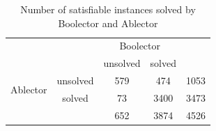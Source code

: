 \begin{table}[ht]
    \begin{center}
    \begin{tabular}{cc|c|c|c}
        &&\multicolumn{2}{c|}{Boolector}&\\
        &&unsolved&solved&\\ \hline
        \multirow{2}{*}{Ablector}&unsolved& 579 & 474 & 1053 \\ \cline{2-5}
        & solved & 73 & 3400 & 3473 \\ \hline
        & & 652 & 3874 & 4526 \\
    \end{tabular}
    \end{center}
    \caption{Number of satisfiable instances solved by Boolector and Ablector}
    \label{tab:evaluation:sat:solvedUnsolved}
\end{table}
